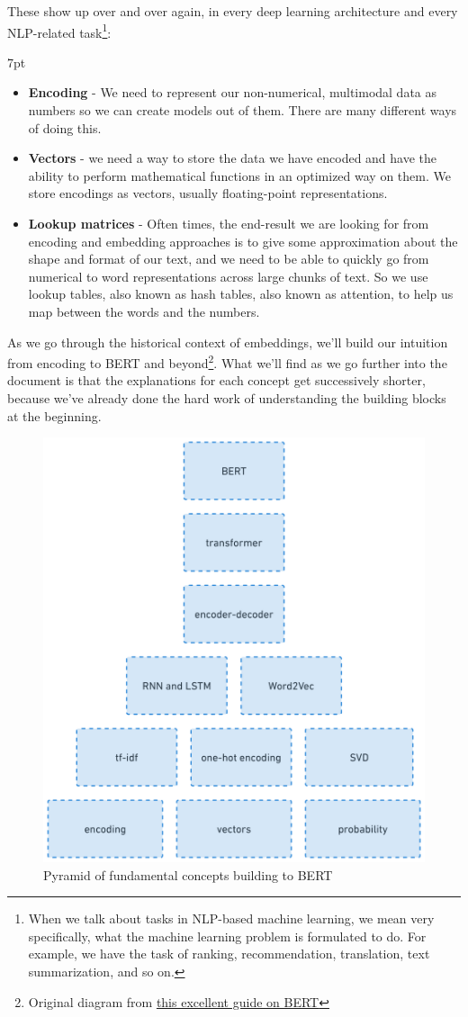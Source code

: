 \documentclass[11pt, table]{diazessay} %
\newenvironment{formal}{%
  \def\FrameCommand{%
	\hspace{1pt}%
	{\color{w_lightblue}\vrule width 2pt}%
	{\color{formalshade}\vrule width 4pt}%
	\colorbox{formalshade}%
  }%
  \MakeFramed{\advance\hsize-\width\FrameRestore}%
  \noindent\hspace{-4.55pt}%
  \begin{adjustwidth}{}{7pt}%
  \vspace{2pt}\vspace{2pt}%
}
{%
  \vspace{2pt}\end{adjustwidth}\endMakeFramed%
}
\begin{document}
\begin{sloppypar}
These show up over and over again, in every deep learning architecture and every NLP-related task\footnote{When we talk about tasks in NLP-based machine learning, we mean very specifically, what the machine learning problem is formulated to do. For example, we have the task of ranking, recommendation, translation, text summarization, and so on.}:

\begin{formal}
\begin{itemize}
  \item \textbf{Encoding} - We need to represent our non-numerical, multimodal data as numbers so we can create models out of them. There are many different ways of doing this.
  \item \textbf{Vectors} - we need a way to store the data we have encoded and have the ability to perform mathematical functions in an optimized way on them. We store encodings as vectors, usually floating-point representations.
  \item \textbf{Lookup matrices} - Often times, the end-result we are looking for from encoding and embedding approaches is to give some approximation about the shape and format of our text, and we need to be able to quickly go from numerical to word representations across large chunks of text. So we use lookup tables, also known as hash tables, also known as attention, to help us map between the words and the numbers.
\end{itemize}
\end{formal}

As we go through the historical context of embeddings, we'll build our intuition from encoding to BERT and beyond\footnote{Original diagram from  \href{http://mccormickml.com/2019/11/11/bert-research-ep-1-key-concepts-and-sources/}{this excellent guide on BERT}}. What we'll find as we go further into the document is that the explanations for each concept get successively shorter, because we've already done the hard work of understanding the building blocks at the beginning.

\begin{figure}[H]
\centering
\includegraphics[width=.6\textwidth]{figures/pyramid.png}
\caption{Pyramid of fundamental concepts building to BERT}
\end{figure}


\end{sloppypar}
\end{document}
